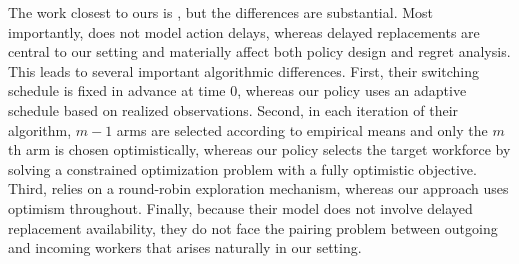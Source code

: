 \documentclass[opre,blindrev]{informs3}
\begin{document}
The work closest to ours is \cite{agrawal1990switching}, but the differences are substantial. Most importantly, \cite{agrawal1990switching} does not model action delays, whereas delayed replacements are central to our setting and materially affect both policy design and regret analysis. This leads to several important algorithmic differences.
First, their switching schedule is fixed in advance at time 0, whereas our policy uses an adaptive schedule based on realized observations. Second, in each iteration of their algorithm, \(m-1\) arms are selected according to empirical means and only the \(m\)th arm is chosen optimistically, whereas our policy selects the target workforce by solving a constrained optimization problem with a fully optimistic objective. Third, \cite{agrawal1990switching} relies on a round-robin exploration mechanism, whereas our approach uses optimism throughout. Finally, because their model does not involve delayed replacement availability, they do not face the pairing problem between outgoing and incoming workers that arises naturally in our setting.

\end{document}
